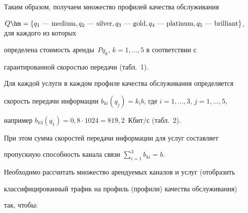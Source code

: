    


   Таким образом, получаем множество профилей качества обслуживания 


$Q\hm=\{q_1~\mbox{---}\ \mbox{medium},


q_2~\mbox{---}\ \mbox{silver},


     q_3~\mbox{---}\ \mbox{gold},


     q_4~\mbox{---}\ \mbox{platinum},


     q_5~\mbox{---}\ \mbox{brilliant}\}$, для каждого из которых 


определена стоимость аренды~$Pq_k$, $k=1,\ldots , 5$ в соответствии с 


гарантированной скоростью передачи (табл.~1).


   


   Для каждой услуги в каждом профиле качества обслуживания определяется 


скорость передачи информации $b_{ki}(q_j) =k_i b$, где $i=1,\ldots , 3$, $j=1, \ldots  ,5$, 


например $b_{k3}(q_1) =0{,}8\cdot 1024=819{,}2$~Кбит/\!с (табл.~2).


   





   


   При этом сумма скоростей передачи информации для услуг составляет 


пропускную способность канала связи $\sum\limits_{i=1}^3 b_{ki}=b$.


   


   Необходимо рассчитать множество арендуемых каналов и услуг (отобразить 


классифицированный трафик на профиль (профили) качества обслуживания) 


так, чтобы:


